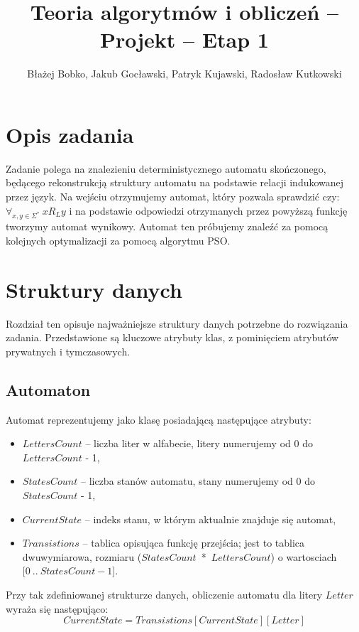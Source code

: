 \documentclass{../llncs_template/llncs}
\begin{document}
\title{Teoria algorytmów i obliczeń -- Projekt -- Etap 1}
\author{Błażej Bobko, Jakub Gocławski, Patryk Kujawski, Radosław Kutkowski}
\maketitle 

\section{Opis zadania}

Zadanie polega na znalezieniu deterministycznego automatu skończonego, będącego rekonstrukcją struktury automatu na podstawie relacji indukowanej przez język. Na wejściu otrzymujemy automat, który pozwala sprawdzić czy: $\forall _{x,y \in \Sigma^*}\ x R_L y$ i na podstawie odpowiedzi otrzymanych przez powyższą funkcję tworzymy automat wynikowy. Automat ten próbujemy znaleźć za pomocą kolejnych optymalizacji za pomocą algorytmu PSO.

\section{Struktury danych}
\label{sec:data_struct}
Rozdział ten opisuje najważniejsze struktury danych potrzebne do rozwiązania zadania. Przedstawione są kluczowe atrybuty klas, z pominięciem atrybutów prywatnych i tymczasowych.

\subsection*{Automaton}
Automat reprezentujemy jako klasę posiadającą następujące atrybuty:
\begin{itemize}
\item $LettersCount$ -- liczba liter w alfabecie, litery numerujemy od 0 do $LettersCount$ - 1,
\item $StatesCount$ -- liczba stanów automatu, stany numerujemy od 0 do $StatesCount$ - 1,
\item $CurrentState$ -- indeks stanu, w którym aktualnie znajduje się automat,
\item $Transistions$ -- tablica opisująca funkcję przejścia; jest to tablica dwuwymiarowa, rozmiaru ($StatesCount$\ *\ $LettersCount$) o wartosciach $[0\ ..\ StatesCount - 1$].
\end{itemize}
Przy tak zdefiniowanej strukturze danych, obliczenie automatu dla litery $Letter$ wyraża się następująco:
\[
  CurrentState = Transistions[CurrentState][Letter]
\]
\end{document}
